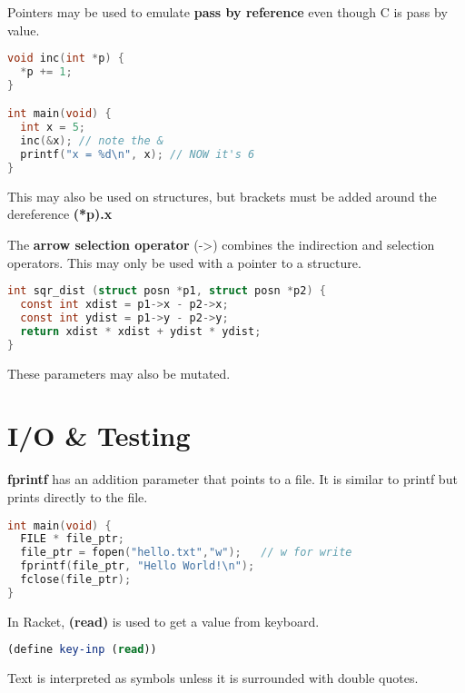 \documentclass[english, 12pt]{article}
\begin{document}
\begin{note}
Pointers may be used to emulate \textbf{pass by reference} even though C is pass by value.


\begin{lstlisting}[language=C]
void inc(int *p) {
  *p += 1;
}

int main(void) {
  int x = 5;
  inc(&x); // note the &
  printf("x = %d\n", x); // NOW it's 6
}
\end{lstlisting}
This may also be used on structures, but brackets must be added around the dereference \textbf{(*p).x}
\end{note}

\begin{defn}
The \textbf{arrow selection operator} (->) combines the indirection and selection operators. This may only be used with a pointer to a structure.
\begin{lstlisting}[language=C]
int sqr_dist (struct posn *p1, struct posn *p2) {
  const int xdist = p1->x - p2->x;
  const int ydist = p1->y - p2->y;
  return xdist * xdist + ydist * ydist;
}
\end{lstlisting}
\begin{note}
These parameters may also be mutated.
\end{note}
\end{defn}

\section{I/O \& Testing}

\begin{defn}
\textbf{fprintf} has an addition parameter that points to a file. It is similar to printf but prints directly to the file.
\begin{lstlisting}[language=C]
int main(void) {
  FILE * file_ptr;
  file_ptr = fopen("hello.txt","w");   // w for write
  fprintf(file_ptr, "Hello World!\n");
  fclose(file_ptr);
}
\end{lstlisting}
\end{defn}

\begin{defn}
In Racket, \textbf{(read)} is used to get a value from keyboard.
\begin{lstlisting}[language=Scheme]
(define key-inp (read))
\end{lstlisting}
Text is interpreted as symbols unless it is surrounded with double quotes.
\end{defn}
\end{document}
